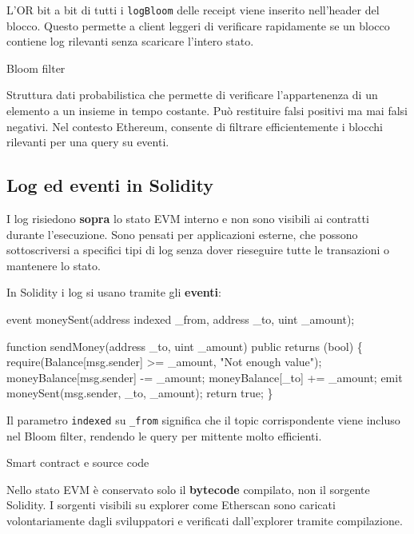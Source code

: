 \documentclass[
  italian,
  openany]{book}
\newenvironment{Shaded}{\begin{snugshade}}{\end{snugshade}}
\newcommand{\NormalTok}[1]{#1}
\begin{document}
L'OR bit a bit di tutti i \texttt{logBloom} delle receipt viene inserito
nell'header del blocco. Questo permette a client leggeri di verificare
rapidamente se un blocco contiene log rilevanti senza scaricare l'intero
stato.

\begin{calloutdefinition}{Bloom filter}

Struttura dati probabilistica che permette di verificare l'appartenenza
di un elemento a un insieme in tempo costante. Può restituire falsi
positivi ma mai falsi negativi. Nel contesto Ethereum, consente di
filtrare efficientemente i blocchi rilevanti per una query su eventi.

\end{calloutdefinition}

\subsection{Log ed eventi in Solidity}\label{log-ed-eventi-in-solidity}

I log risiedono \textbf{sopra} lo stato EVM interno e non sono visibili
ai contratti durante l'esecuzione. Sono pensati per applicazioni
esterne, che possono sottoscriversi a specifici tipi di log senza dover
rieseguire tutte le transazioni o mantenere lo stato.

In Solidity i log si usano tramite gli \textbf{eventi}:

\begin{Shaded}
\begin{Highlighting}[]
\NormalTok{event moneySent(address indexed \_from, address \_to, uint \_amount);}

\NormalTok{function sendMoney(address \_to, uint \_amount) public returns (bool) \{}
\NormalTok{    require(Balance[msg.sender] \textgreater{}= \_amount, "Not enough value");}
\NormalTok{    moneyBalance[msg.sender] {-}= \_amount;}
\NormalTok{    moneyBalance[\_to] += \_amount;}
\NormalTok{    emit moneySent(msg.sender, \_to, \_amount);}
\NormalTok{    return true;}
\NormalTok{\}}
\end{Highlighting}
\end{Shaded}

Il parametro \texttt{indexed} su \texttt{\_from} significa che il topic
corrispondente viene incluso nel Bloom filter, rendendo le query per
mittente molto efficienti.

\begin{calloutnote}{Smart contract e source code}

Nello stato EVM è conservato solo il \textbf{bytecode} compilato, non il
sorgente Solidity. I sorgenti visibili su explorer come Etherscan sono
caricati volontariamente dagli sviluppatori e verificati dall'explorer
tramite compilazione.

\end{calloutnote}
\end{document}
